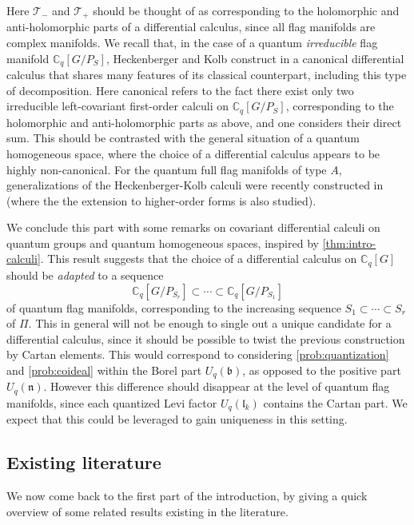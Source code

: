 \documentclass[a4paper, 12pt, reqno, english]{amsart}
\numberwithin{equation}{section}
\numberwithin{figure}{section}
\theoremstyle{plain}
\theoremstyle{plain}
\theoremstyle{plain}
\theoremstyle{plain}
\theoremstyle{plain}
\theoremstyle{definition}
\theoremstyle{definition}
\theoremstyle{definition}
\theoremstyle{remark}
\theoremstyle{definition}
\theoremstyle{definition}
\newcommand{\Uqb}{U_q(\mathfrak{b})}
\newcommand{\Uqn}{U_q(\mathfrak{n})}
\newcommand{\Uqlk}{U_q(\mathfrak{l}_k)}
\newcommand{\CqG}{\mathbb{C}_q[G]}
\newcommand{\simpleroots}{\Pi}
\newcommand{\Cq}{\mathbb{C}_q}
\newcommand{\tang}{\mathcal{T}}
\begin{document}
Here $\tang_-$ and $\tang_+$ should be thought of as corresponding to the holomorphic and anti-holomorphic parts of a differential calculus, since all flag manifolds are complex manifolds.
We recall that, in the case of a quantum \emph{irreducible} flag manifold $\Cq[G / P_S]$, Heckenberger and Kolb construct in \cite{heko} a canonical differential calculus that shares many features of its classical counterpart, including this type of decomposition.
Here canonical refers to the fact there exist only two irreducible left-covariant first-order calculi on $\Cq[G / P_S]$, corresponding to the holomorphic and anti-holomorphic parts as above, and one considers their direct sum.
This should be contrasted with the general situation of a quantum homogeneous space, where the choice of a differential calculus appears to be highly non-canonical.
For the quantum full flag manifolds of type $A$, generalizations of the Heckenberger-Kolb calculi were recently constructed in \cite{reamonn-ar} (where the the extension to higher-order forms is also studied).

We conclude this part with some remarks on covariant differential calculi on quantum groups and quantum homogeneous spaces, inspired by \cref{thm:intro-calculi}.
This result suggests that the choice of a differential calculus on $\CqG$ should be \emph{adapted} to a sequence
\[
\Cq[G / P_{S_r}] \subset \cdots \subset \Cq[G / P_{S_1}]
\]
of quantum flag manifolds, corresponding to the increasing sequence $S_1 \subset \cdots \subset S_r$ of $\simpleroots$.
This in general will not be enough to single out a unique candidate for a differential calculus, since it should be possible to twist the previous construction by Cartan elements.
This would correspond to considering \cref{prob:quantization} and \cref{prob:coideal} within the Borel part $\Uqb$, as opposed to the positive part $\Uqn$.
However this difference should disappear at the level of quantum flag manifolds, since each quantized Levi factor $\Uqlk$ contains the Cartan part.
We expect that this could be leveraged to gain uniqueness in this setting.

\subsection{Existing literature}

We now come back to the first part of the introduction, by giving a quick overview of some related results existing in the literature.
\end{document}
